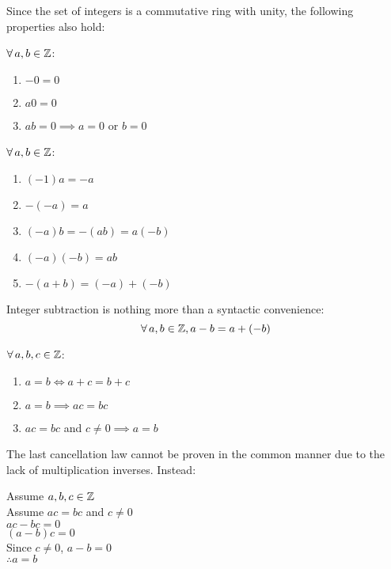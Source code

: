\documentclass[letterpaper,12pt,fleqn]{article}
\begin{document}
Since the set of integers is a commutative ring with unity, the following
properties also hold:

\begin{properties}[Zero]
  $\forall\,a,b\in\mathbb{Z}$:
  \begin{enumerate}
  \item $-0=0$
  \item $a0=0$
  \item $ab=0\implies a=0$ or $b=0$
  \end{enumerate}
\end{properties}
\newpage
\begin{properties}[Negatives]
  $\forall\,a,b\in\mathbb{Z}$:
  \begin{enumerate}
  \item $(-1)a=-a$
  \item $-(-a)=a$
  \item $(-a)b=-(ab)=a(-b)$
  \item $(-a)(-b)=ab$
  \item $-(a+b)=(-a)+(-b)$
  \end{enumerate}
\end{properties}

\begin{notation}
  Integer subtraction is nothing more than a syntactic convenience:
  \[\forall\,a,b\in\mathbb{Z},a-b=a+(-b)\]
\end{notation}

\begin{properties}[Cancellation]
  $\forall\,a,b,c\in\mathbb{Z}$:
  \begin{enumerate}
  \item $a=b\iff a+c=b+c$
  \item $a=b\implies ac=bc$
  \item $ac=bc$ and $c\ne0\implies a=b$
  \end{enumerate}
\end{properties}

The last cancellation law cannot be proven in the common manner due to the
lack of multiplication inverses.  Instead:

\begin{theproof}
  Assume $a,b,c\in\mathbb{Z}$ \\
  Assume $ac=bc$ and $c\ne0$ \\
  $ac-bc=0$ \\
  $(a-b)c=0$ \\
  Since $c\ne0$, $a-b=0$ \\
  $\therefore a=b$
\end{theproof}
\end{document}
